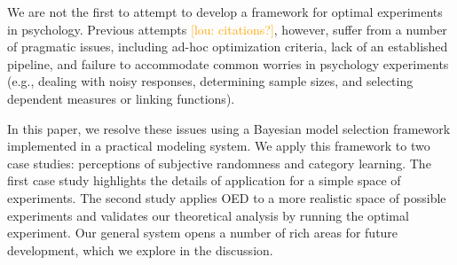 \documentclass{article}
\newcommand{\ndg}[1]{\textcolor{Green}{[ndg: #1]}}
\newcommand{\lou}[1]{\textcolor{orange}{[lou: #1]}}
\begin{document}

We are not the first to attempt to develop a framework for optimal experiments in psychology.
Previous attempts \lou{citations?}, however, suffer from a number of pragmatic issues, including ad-hoc optimization criteria, lack of an established pipeline, and failure to accommodate common worries in psychology experiments (e.g., dealing with noisy responses, determining sample sizes, and selecting dependent measures or linking functions).

In this paper, we resolve these issues using a Bayesian model selection framework implemented in a practical modeling system.
We apply this framework to two case studies: perceptions of subjective randomness and category learning.
The first case study highlights the details of application for a simple space of experiments.
The second study applies OED to a more realistic space of possible experiments and validates our theoretical analysis by running the optimal experiment.
Our general system opens a number of rich areas for future development, which we explore in the discussion.

\end{document}
